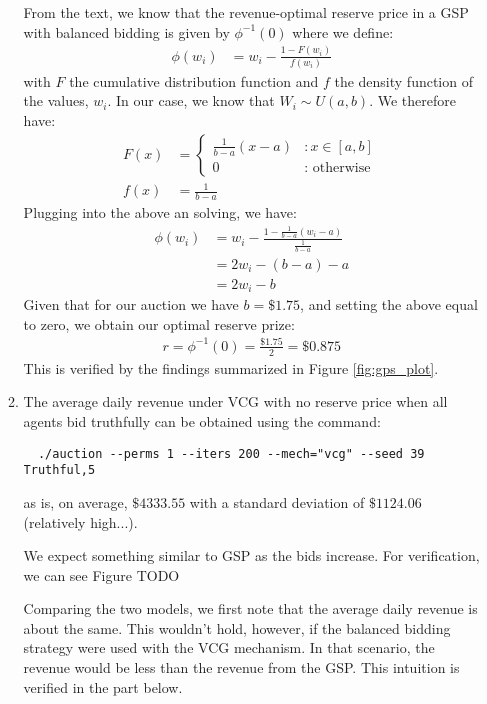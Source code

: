 \documentclass[11pt]{article}
\begin{document}
\begin{enumerate}[resume]
\begin{enumerate}
  From the text, we know that the revenue-optimal reserve price in a GSP with balanced bidding is given by $\phi^{-1}(0)$ where we define:
  \begin{align*}
    \phi(w_i) &= w_i - \frac{1-F(w_i)}{f(w_i)}
  \end{align*}
  with $F$ the cumulative distribution function and $f$ the density function of the values, $w_i$. In our case, we know that $W_i \sim U(a,b)$. We therefore have:
  \begin{align*}
    F(x) &= \left\{
     \begin{array}{lr}
       \frac{1}{b-a}(x - a) & : x \in [a, b] \\
       0 & : \text{ otherwise }
     \end{array}
   \right.\\
   f(x) &= \frac{1}{b-a}  
  \end{align*}
  Plugging into the above an solving, we have:
  \begin{align*}
  \phi(w_i) &= w_i - \frac{1 - \frac{1}{b-a}(w_i - a)}{\frac{1}{b-a}} \\
  &= 2w_i - (b-a) - a \\
  &= 2w_i -b 
  \end{align*}
  Given that for our auction we have $b = \$1.75$, and setting the above equal to zero, we obtain our optimal reserve prize:
  \begin{align*}
  r = \phi^{-1}(0) = \frac{\$1.75}{2} = \$0.875
  \end{align*}
  This is verified by the findings summarized in Figure \ref{fig:gps_plot}.

  \item The average daily revenue under VCG with no reserve price when all agents bid truthfully can be obtained using the command:
  \begin{lstlisting}
  ./auction --perms 1 --iters 200 --mech="vcg" --seed 39  Truthful,5
  \end{lstlisting}
  as is, on average, $\$4333.55$ with a standard deviation of $\$1124.06$ (relatively high...).

  We expect something similar to GSP as the bids increase. For verification, we can see Figure TODO

  Comparing the two models, we first note that the average daily revenue is about the same. This wouldn't hold, however, if the balanced bidding strategy were used with the VCG mechanism. In that scenario, the revenue would be less than the revenue from the GSP. This intuition is verified in the part below.


\end{enumerate}
\end{enumerate}
\end{document}

